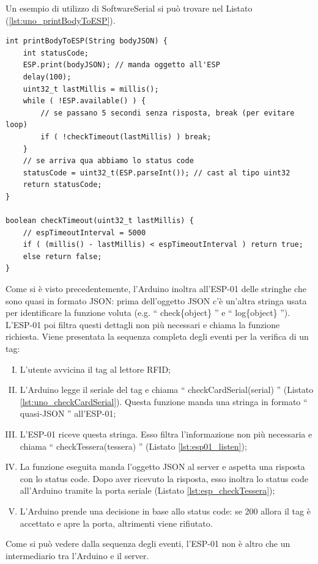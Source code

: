 \documentclass[12pt]{report}
\begin{document}
\noindent Un esempio di utilizzo di SoftwareSerial si può trovare nel Listato (\ref{lst:uno_printBodyToESP}).
\begin{lstlisting}[caption={La funzione printBodyToESP. Essa manda all'ESP-01 (tramite l'oggetto SoftwareSerial) la stringa ricevuta tra gli argomenti e poi aspetta per la risposta. Dopo aver ricevuto la risposta restituisce statusCode.}, label={lst:uno_printBodyToESP}]
int printBodyToESP(String bodyJSON) {
	int statusCode;
	ESP.print(bodyJSON); // manda oggetto all'ESP
	delay(100);
	uint32_t lastMillis = millis();
	while ( !ESP.available() ) {
		// se passano 5 secondi senza risposta, break (per evitare loop)
		if ( !checkTimeout(lastMillis) ) break;
	}
	// se arriva qua abbiamo lo status code
	statusCode = uint32_t(ESP.parseInt()); // cast al tipo uint32
	return statusCode;
}

boolean checkTimeout(uint32_t lastMillis) {
	// espTimeoutInterval = 5000
	if ( (millis() - lastMillis) < espTimeoutInterval ) return true;
	else return false;
}
\end{lstlisting}

Come si è visto precedentemente, l'Arduino inoltra all'ESP-01 delle stringhe che sono quasi in formato JSON: prima dell'oggetto JSON c'è un'altra stringa usata per identificare la funzione voluta (e.g$.$ \textquotedblleft{} check\{object\} \textquotedblright{} e \textquotedblleft{} log\{object\} \textquotedblright{}). L'ESP-01 poi filtra questi dettagli non più necessari e chiama la funzione richiesta.
 Viene presentata la sequenza completa degli eventi per la verifica di un tag:

\begin{enumerate}[(I)]
	\item L'utente avvicina il tag al lettore RFID;
	\item L'Arduino legge il seriale del tag e chiama \textquotedblleft{} checkCardSerial(serial) \textquotedblright{} (Listato \ref{lst:uno_checkCardSerial}). Questa funzione manda una stringa in formato \textquotedblleft{} quasi-JSON \textquotedblright{} all'ESP-01;
	\item L'ESP-01 riceve questa stringa. Esso filtra l'informazione non più necessaria e chiama \textquotedblleft{} checkTessera(tessera) \textquotedblright{} (Listato \ref{lst:esp01_listen});
	\item La funzione eseguita manda l'oggetto JSON al server e aspetta una risposta con lo status code. Dopo aver ricevuto la risposta, esso inoltra lo status code all'Arduino tramite la porta seriale (Listato \ref{lst:esp_checkTessera});
	\item L'Arduino prende una decisione in base allo status code: se 200 allora il tag è accettato e apre la porta, altrimenti viene rifiutato.
\end{enumerate}
Come si può vedere dalla sequenza degli eventi, l'ESP-01 non è altro che un intermediario tra l'Arduino e il server.
%
\end{document}

